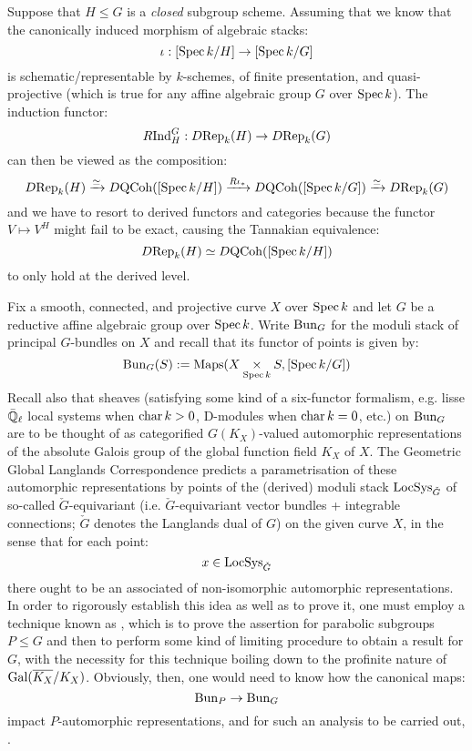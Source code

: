             \begin{corollary}
                Suppose that $H \leq G$ is a \textit{closed} subgroup scheme. Assuming that we know that the canonically induced morphism of algebraic stacks:
                    $$\iota: [\operatorname{Spec} k/H] \to [\operatorname{Spec} k/G]$$
                is schematic/representable by $k$-schemes, of finite presentation, and quasi-projective (which is true for any affine algebraic group $G$ over $\operatorname{Spec} k$). The induction functor:
                    $$R\mathrm{Ind}_H^G: D\mathrm{Rep}_k(H) \to D\mathrm{Rep}_k(G)$$
                can then be viewed as the composition:
                    $$D\mathrm{Rep}_k(H) \xrightarrow[]{\simeq} D\mathrm{QCoh}([\operatorname{Spec} k/H]) \xrightarrow[]{R\iota_*} D\mathrm{QCoh}([\operatorname{Spec} k/G]) \xrightarrow[]{\simeq} D\mathrm{Rep}_k(G)$$
                and we have to resort to derived functors and categories because the functor $V \mapsto V^H$ might fail to be exact, causing the Tannakian equivalence:
                    $$D\mathrm{Rep}_k(H) \simeq D\mathrm{QCoh}([\operatorname{Spec} k/H])$$
                to only hold at the derived level.
            \end{corollary}
            \begin{remark}
                Fix a smooth, connected, and projective curve $X$ over $\operatorname{Spec} k$ and let $G$ be a reductive affine algebraic group over $\operatorname{Spec} k$. Write $\mathrm{Bun}_G$ for the moduli stack of principal $G$-bundles on $X$ and recall that its functor of points is given by:
                    $$\Bun_G(S) := \Maps(X \x_{\Spec k} S, [\Spec k/G])$$
                Recall also that sheaves (satisfying some kind of a six-functor formalism, e.g. lisse $\bar{\mathbb{Q}}_{\ell}$ local systems when $\operatorname{char} k > 0$, D-modules when $\operatorname{char} k = 0$, etc.) on $\mathrm{Bun}_G$ are to be thought of as categorified $G(K_X)$-valued automorphic representations of the absolute Galois group of the global function field $K_X$ of $X$. The Geometric Global Langlands Correspondence predicts a parametrisation of these automorphic representations by points of the (derived) moduli stack $\mathrm{LocSys}_{\check{G}}$ of so-called $\check{G}$-equivariant  (i.e. $\check{G}$-equivariant vector bundles + integrable connections; $\check{G}$ denotes the Langlands dual of $G$) on the given curve $X$, in the sense that for each point:
                    $$x \in \mathrm{LocSys}_{\check{G}}$$
                there ought to be an associated  of non-isomorphic automorphic representations. In order to rigorously establish this idea as well as to prove it, one must employ a technique known as , which is to prove the assertion for parabolic subgroups $P \leq G$ and then to perform some kind of limiting procedure to obtain a result for $G$, with the necessity for this technique boiling down to the profinite nature of $\mathrm{Gal}(\overline{K_X}/K_X)$. Obviously, then, one would need to know how the canonical maps:
                    $$\mathrm{Bun}_P \to \mathrm{Bun}_G$$
                impact $P$-automorphic representations, and for such an analysis to be carried out, .
            \end{remark}
    
